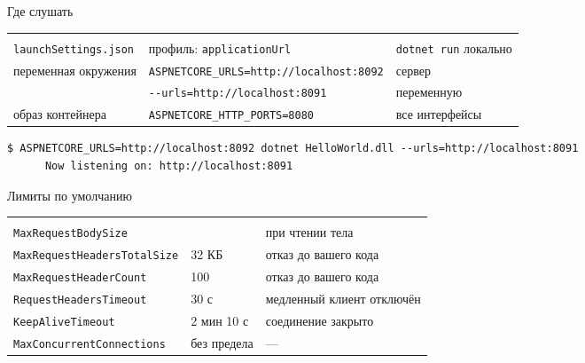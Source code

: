 \documentclass[aspectratio=169,10pt,t]{beamer}
\newcommand{\termsm}{\ttfamily\fontsize{6.6}{7.9}\selectfont}
\begin{document}
\begin{frame}[fragile]{Где слушать}
  \slidetop

  {\renewcommand{\arraystretch}{1.3}\footnotesize
  \begin{tabular}{@{}L{3.5cm}L{6.4cm}L{2.9cm}@{}}
     &  &  \\
    \texttt{launchSettings.json} & профиль: \texttt{applicationUrl} & \texttt{dotnet run}
      локально \\
    переменная окружения & \texttt{ASPNETCORE\_URLS=http://localhost:8092} & сервер \\
            & \texttt{-{}-urls=http://localhost:8091} & 
      переменную \\
    образ контейнера     & \texttt{ASPNETCORE\_HTTP\_PORTS=8080} & все интерфейсы \\
  \end{tabular}}

  \slidegap
\begin{lstlisting}[style=term,basicstyle=\termsm]
$ ASPNETCORE_URLS=http://localhost:8092 dotnet HelloWorld.dll --urls=http://localhost:8091
      Now listening on: http://localhost:8091
\end{lstlisting}

\end{frame}

\begin{frame}{Лимиты по умолчанию}
  \slidetop

  {\renewcommand{\arraystretch}{1.25}\small
  \begin{tabular}{@{}L{5.2cm}L{2.9cm}L{4.7cm}@{}}
     &  &  \\
    \texttt{MaxRequestBodySize}         &  &  при чтении тела \\
    \texttt{MaxRequestHeadersTotalSize} & 32 КБ  & отказ до вашего кода \\
    \texttt{MaxRequestHeaderCount}      & 100    & отказ до вашего кода \\
    \texttt{RequestHeadersTimeout}      & 30 с   & медленный клиент отключён \\
    \texttt{KeepAliveTimeout}           & 2 мин 10 с & соединение закрыто \\
    \texttt{MaxConcurrentConnections}   & без предела & --- \\
  \end{tabular}}
\end{frame}
\end{document}
